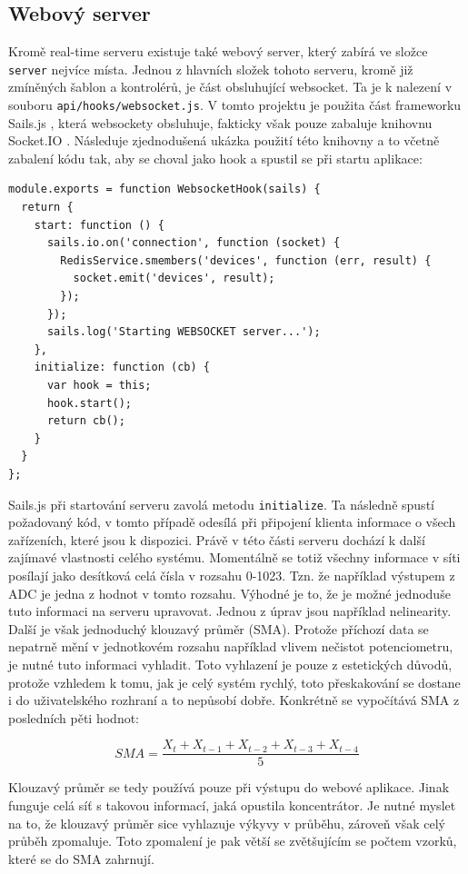 \subsection{Webový server}
Kromě real-time serveru existuje také webový server, který zabírá ve složce \texttt{server} nejvíce místa. Jednou z hlavních složek tohoto serveru, kromě již zmíněných šablon a kontrolérů, je část obsluhující websocket. Ta je k nalezení v souboru \texttt{api/hooks/websocket.js}. V tomto projektu je použita část frameworku Sails.js \cite{sails}, která websockety obsluhuje, fakticky však pouze zabaluje knihovnu Socket.IO \cite{socket}. Následuje zjednodušená ukázka použití této knihovny a to včetně zabalení kódu tak, aby se choval jako hook a spustil se při startu aplikace:

\begin{verbatim}
module.exports = function WebsocketHook(sails) {
  return {
    start: function () {
      sails.io.on('connection', function (socket) {
        RedisService.smembers('devices', function (err, result) {
          socket.emit('devices', result);
        });
      });
      sails.log('Starting WEBSOCKET server...');
    },
    initialize: function (cb) {
      var hook = this;
      hook.start();
      return cb();
    }
  }
};
\end{verbatim}

Sails.js při startování serveru zavolá metodu \texttt{initialize}. Ta následně spustí požadovaný kód, v tomto případě odesílá při připojení klienta informace o všech zařízeních, které jsou k dispozici. Právě v této části serveru dochází k další zajímavé vlastnosti celého systému. Momentálně se totiž všechny informace v síti posílají jako desítková celá čísla v rozsahu 0-1023. Tzn. že například výstupem z ADC je jedna z hodnot v tomto rozsahu. Výhodné je to, že je možné jednoduše tuto informaci na serveru upravovat. Jednou z úprav jsou například nelinearity. Další je však jednoduchý klouzavý průměr (SMA). Protože příchozí data se nepatrně mění v jednotkovém rozsahu například vlivem nečistot potenciometru, je nutné tuto informaci vyhladit. Toto vyhlazení je pouze z estetických důvodů, protože vzhledem k tomu, jak je celý systém rychlý, toto přeskakování se dostane i do uživatelského rozhraní a to nepůsobí dobře. Konkrétně se vypočítává SMA z posledních pěti hodnot:

\begin{equation}
	SMA = \dfrac{X_t + X_{t-1} + X_{t-2} + X_{t-3} + X_{t-4}}{5}
	\label{eq:sma}
\end{equation}

Klouzavý průměr se tedy používá pouze při výstupu do webové aplikace. Jinak funguje celá síť s takovou informací, jaká opustila koncentrátor. Je nutné myslet na to, že klouzavý průměr sice vyhlazuje výkyvy v průběhu, zároveň však celý průběh zpomaluje. Toto zpomalení je pak větší se zvětšujícím se počtem vzorků, které se do SMA zahrnují.
